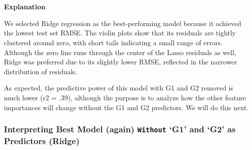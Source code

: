 \documentclass[9pt]{article}
\begin{document}
    
    \begin{center}
    \end{center}
    { \hspace*{\fill} \\}
    
    \begin{center}
    \end{center}
    { \hspace*{\fill} \\}
    
    \textbf{Explanation}

We selected Ridge regression as the best-performing model because it
achieved the lowest test set RMSE. The violin plots show that its
residuals are tightly clustered around zero, with short tails indicating
a small range of errors. Although the zero line runs through the center
of the Lasso residuals as well, Ridge was preferred due to its slightly
lower RMSE, reflected in the narrower distribution of residuals.

As expected, the predictive power of this model with G1 and G2 removed
is much lower (r2 = .39), although the purpose is to analyze how the
other feature importances will change without the G1 and G2 predictors.
We will do this next.

    \hypertarget{interpreting-best-model-again-without-g1-and-g2-as-predictors-ridge}{%
\subsubsection{\texorpdfstring{Interpreting Best Model (again)
\texttt{Without} `G1' and `G2' as Predictors
(Ridge)}{Interpreting Best Model (again) Without `G1' and `G2' as Predictors (Ridge)}}\label{interpreting-best-model-again-without-g1-and-g2-as-predictors-ridge}}
\end{document}
